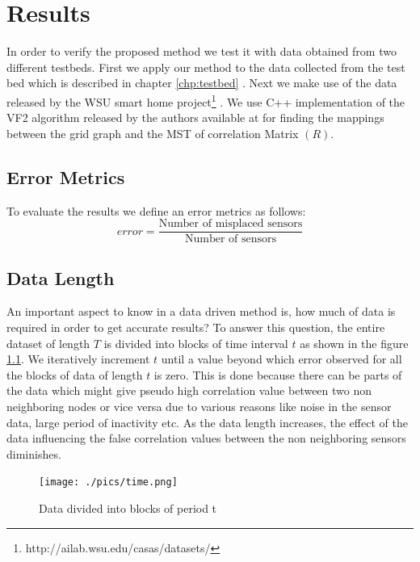 \chapter{Results}
In order to verify the proposed method we test it with data obtained from two different testbeds. First we apply our method to the data collected from the test bed which is described in chapter \ref{chp:testbed} . Next we make use of the data released by the WSU smart home project\footnote{http://ailab.wsu.edu/casas/datasets/} \cite{cook2009assessing}. We use C++ implementation of the VF2 algorithm released by the authors available at \cite{vfLib} for finding the mappings between the grid graph and the MST of correlation Matrix $(R)$.
\section{Error Metrics }
To evaluate the results we define an error metrics as follows:\\
\begin{equation}
error=\frac{\text{Number of misplaced sensors}}{\text{Number of sensors}}
\end{equation}
\section{Data Length}
\label{sec:dataLength}
An important aspect to know in a data driven method is, how much of data is required in order to get accurate results? To answer this question, the entire dataset of length $T$ is divided into blocks of time interval $t$ as shown in the figure \ref{fig:time}. We iteratively increment $t$ until a value beyond which error observed for all the blocks of data of length $t$ is zero. 
This is done because there can be parts of the data which might give pseudo high correlation value between two non neighboring nodes or vice versa due to various reasons like noise in the sensor data, large period of inactivity etc. As the data length increases, the effect of the data influencing the false correlation values between the non neighboring sensors diminishes.

\begin{figure}[!ht]
\texttt{[image: ./pics/time.png]}
\caption{Data divided into blocks of period t}
\label{fig:time}
\end{figure}

